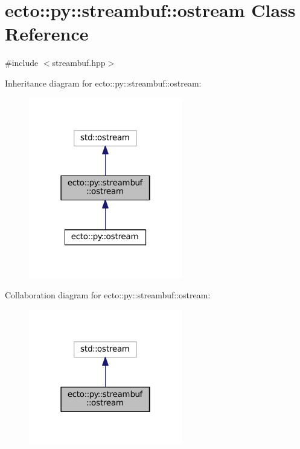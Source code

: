 \hypertarget{classecto_1_1py_1_1streambuf_1_1ostream}{}\section{ecto\+:\+:py\+:\+:streambuf\+:\+:ostream Class Reference}
\label{classecto_1_1py_1_1streambuf_1_1ostream}


{\ttfamily \#include $<$streambuf.\+hpp$>$}



Inheritance diagram for ecto\+:\+:py\+:\+:streambuf\+:\+:ostream\+:\nopagebreak
\begin{figure}[H]
\begin{center}
\leavevmode
\includegraphics[width=190pt]{classecto_1_1py_1_1streambuf_1_1ostream__inherit__graph}
\end{center}
\end{figure}


Collaboration diagram for ecto\+:\+:py\+:\+:streambuf\+:\+:ostream\+:\nopagebreak
\begin{figure}[H]
\begin{center}
\leavevmode
\includegraphics[width=190pt]{classecto_1_1py_1_1streambuf_1_1ostream__coll__graph}
\end{center}
\end{figure}
